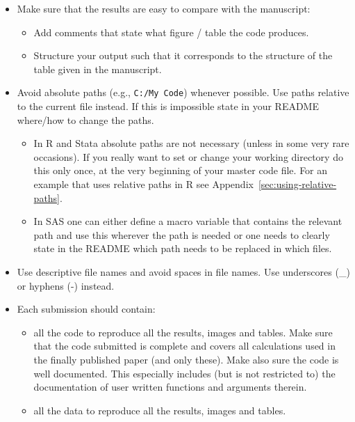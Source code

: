 \documentclass[12pt,a4paper]{article}
\begin{document}
\begin{itemize}
\begin{itemize}
  \end{itemize}
\item Make sure that the results are easy to compare with the manuscript:
  \begin{itemize}
  \item Add comments that state what figure / table the code produces.
  \item Structure your output such that it corresponds to the structure of the
    table given in the manuscript.
  \end{itemize}
\item Avoid absolute paths (e.g., \verb+C:/My Code+) whenever possible. Use
  paths relative to the current file instead. If this is impossible state in
  your README where/how to change the paths.
  \begin{itemize}
  \item In \textsf{R} and \textsf{Stata} absolute paths are not necessary
    (unless in some very rare occasions). If you really want to set or change
    your working directory do this only once, at the very beginning of your
    master code file. For an example that uses relative paths in \textsf{R} see
    Appendix~\ref{sec:using-relative-paths}.
  \item In \textsf{SAS} one can either define a macro variable that contains the
    relevant path and use this wherever the path is needed or one needs to
    clearly state in the README which path needs to be replaced in which files.
  \end{itemize}
\item Use descriptive file names and avoid spaces in file names. Use underscores
  (\_) or hyphens (-) instead.
\item Each submission {should} contain:
\begin{itemize}
\item all the code to reproduce all the results, images and tables. Make sure
  that the code submitted is complete and covers all calculations used in the
  finally published paper (and only these). Make also sure the code is well
  documented. This especially includes (but is not restricted to) the
  documentation of user written functions and arguments therein.
\item all the data to reproduce all the results, images and tables. %

\end{itemize}
\end{itemize}
\end{document}

